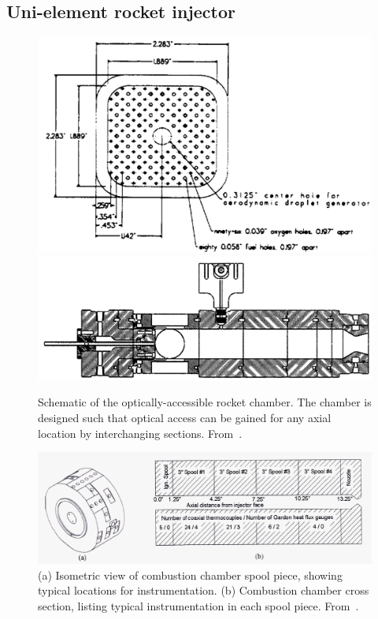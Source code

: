 \subsection{Uni-element rocket injector}

\begin{figure}[H]
    \centering
    \includegraphics[width=0.35\linewidth]{figs/CCL/fig0.png}
    \includegraphics[width=0.5\linewidth]{figs/CCL/fig2a.png}
    \caption{Schematic of the optically-accessible rocket chamber. The chamber is designed such that optical access can be gained for any axial location by interchanging sections. From~\cite{santoro1997experimental, santoro1999main}.}
    \label{fig:enter-label}
\end{figure}

\begin{figure}[H]
    \centering
    \includegraphics[width=\linewidth]{figs/CCL/fig4.png}
    \caption{(a) Isometric view of combustion chamber spool piece, showing typical locations for instrumentation. (b) Combustion chamber cross section, listing typical instrumentation in each spool piece. From~\cite{jones2006local}.}
    \label{fig:enter-label}
\end{figure}

